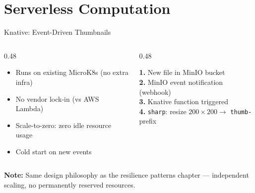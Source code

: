 \section{Serverless Computation}


\begin{frame}{Knative: Event-Driven Thumbnails}
    \vspace{0.2cm}
    \begin{columns}[T]
        \begin{column}{0.48\textwidth}
            \begin{tcolorbox}[colback=blue!3, colframe=HUAblue, arc=2pt, boxrule=0.6pt,
                colbacktitle=HUAblue, coltitle=white,
                title=\footnotesize\textbf{Why Knative?}]
                \scriptsize
                \begin{itemize}
                    \item Runs on existing MicroK8s (no extra infra)
                    \item No vendor lock-in (vs AWS Lambda)
                    \item Scale-to-zero: zero idle resource usage
                    \item Cold start on new events
                \end{itemize}
            \end{tcolorbox}
        \end{column}
        \begin{column}{0.48\textwidth}
            \begin{tcolorbox}[colback=blue!3, colframe=HUAblue, arc=2pt, boxrule=0.6pt,
                colbacktitle=HUAblue, coltitle=white,
                title=\footnotesize\textbf{Triggering Mechanism}]
                \scriptsize
                \textbf{1.} New file in MinIO bucket \\[0.15cm]
                \textbf{2.} MinIO event notification (webhook) \\[0.15cm]
                \textbf{3.} Knative function triggered \\[0.15cm]
                \textbf{4.} \texttt{sharp}: resize $200\times200 \rightarrow$ \texttt{thumb-} prefix
            \end{tcolorbox}
        \end{column}
    \end{columns}

    \vspace{0.35cm}

    \begin{tcolorbox}[colback=gray!5, colframe=gray!30, arc=2pt, boxrule=0.5pt]
        \scriptsize \textcolor{HUAblue}{\textbf{Note:}} Same design philosophy as the
        resilience patterns chapter — independent scaling, no permanently reserved resources.
    \end{tcolorbox}
\end{frame}

